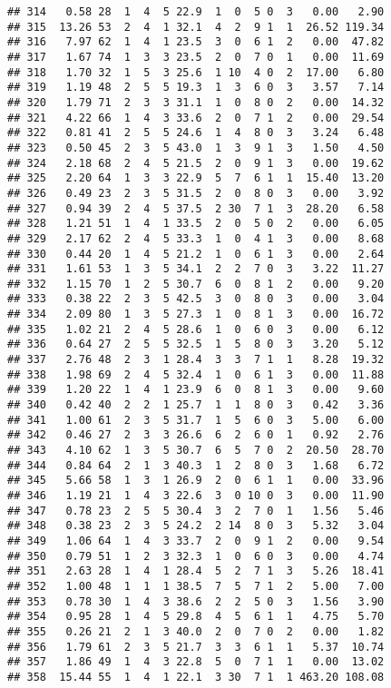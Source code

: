 \documentclass[
]{article}
\begin{document}
\begin{verbatim}
## 314   0.58 28  1  4  5 22.9  1  0  5 0  3   0.00   2.90
## 315  13.26 53  2  4  1 32.1  4  2  9 1  1  26.52 119.34
## 316   7.97 62  1  4  1 23.5  3  0  6 1  2   0.00  47.82
## 317   1.67 74  1  3  3 23.5  2  0  7 0  1   0.00  11.69
## 318   1.70 32  1  5  3 25.6  1 10  4 0  2  17.00   6.80
## 319   1.19 48  2  5  5 19.3  1  3  6 0  3   3.57   7.14
## 320   1.79 71  2  3  3 31.1  1  0  8 0  2   0.00  14.32
## 321   4.22 66  1  4  3 33.6  2  0  7 1  2   0.00  29.54
## 322   0.81 41  2  5  5 24.6  1  4  8 0  3   3.24   6.48
## 323   0.50 45  2  3  5 43.0  1  3  9 1  3   1.50   4.50
## 324   2.18 68  2  4  5 21.5  2  0  9 1  3   0.00  19.62
## 325   2.20 64  1  3  3 22.9  5  7  6 1  1  15.40  13.20
## 326   0.49 23  2  3  5 31.5  2  0  8 0  3   0.00   3.92
## 327   0.94 39  2  4  5 37.5  2 30  7 1  3  28.20   6.58
## 328   1.21 51  1  4  1 33.5  2  0  5 0  2   0.00   6.05
## 329   2.17 62  2  4  5 33.3  1  0  4 1  3   0.00   8.68
## 330   0.44 20  1  4  5 21.2  1  0  6 1  3   0.00   2.64
## 331   1.61 53  1  3  5 34.1  2  2  7 0  3   3.22  11.27
## 332   1.15 70  1  2  5 30.7  6  0  8 1  2   0.00   9.20
## 333   0.38 22  2  3  5 42.5  3  0  8 0  3   0.00   3.04
## 334   2.09 80  1  3  5 27.3  1  0  8 1  3   0.00  16.72
## 335   1.02 21  2  4  5 28.6  1  0  6 0  3   0.00   6.12
## 336   0.64 27  2  5  5 32.5  1  5  8 0  3   3.20   5.12
## 337   2.76 48  2  3  1 28.4  3  3  7 1  1   8.28  19.32
## 338   1.98 69  2  4  5 32.4  1  0  6 1  3   0.00  11.88
## 339   1.20 22  1  4  1 23.9  6  0  8 1  3   0.00   9.60
## 340   0.42 40  2  2  1 25.7  1  1  8 0  3   0.42   3.36
## 341   1.00 61  2  3  5 31.7  1  5  6 0  3   5.00   6.00
## 342   0.46 27  2  3  3 26.6  6  2  6 0  1   0.92   2.76
## 343   4.10 62  1  3  5 30.7  6  5  7 0  2  20.50  28.70
## 344   0.84 64  2  1  3 40.3  1  2  8 0  3   1.68   6.72
## 345   5.66 58  1  3  1 26.9  2  0  6 1  1   0.00  33.96
## 346   1.19 21  1  4  3 22.6  3  0 10 0  3   0.00  11.90
## 347   0.78 23  2  5  5 30.4  3  2  7 0  1   1.56   5.46
## 348   0.38 23  2  3  5 24.2  2 14  8 0  3   5.32   3.04
## 349   1.06 64  1  4  3 33.7  2  0  9 1  2   0.00   9.54
## 350   0.79 51  1  2  3 32.3  1  0  6 0  3   0.00   4.74
## 351   2.63 28  1  4  1 28.4  5  2  7 1  3   5.26  18.41
## 352   1.00 48  1  1  1 38.5  7  5  7 1  2   5.00   7.00
## 353   0.78 30  1  4  3 38.6  2  2  5 0  3   1.56   3.90
## 354   0.95 28  1  4  5 29.8  4  5  6 1  1   4.75   5.70
## 355   0.26 21  2  1  3 40.0  2  0  7 0  2   0.00   1.82
## 356   1.79 61  2  3  5 21.7  3  3  6 1  1   5.37  10.74
## 357   1.86 49  1  4  3 22.8  5  0  7 1  1   0.00  13.02
## 358  15.44 55  1  4  1 22.1  3 30  7 1  1 463.20 108.08

\end{verbatim}
\end{document}
